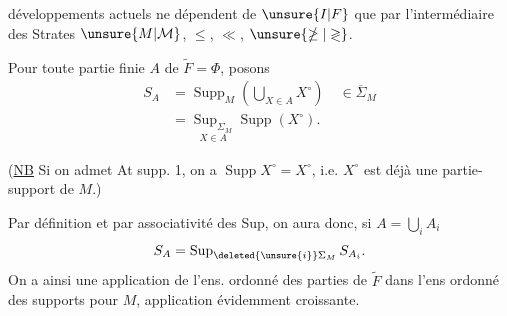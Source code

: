 développements actuels ne dépendent de $\unsure{I|F}$ que par l'intermédiaire des Strates $\unsure{M|\mathcal M}$, $\leq$, $\ll$, $\unsure{\ngeq|\gtrless}$.


Pour toute partie finie $A$ de $\widetilde F=\Phi$, posons
\[
\begin{aligned}
S_A&=\operatorname{Supp}_{M}\left(\bigcup_{X\in A}X^\circ\right)\quad\in\overline\Sigma_M\\
&=\underset{X\in A}{\operatorname{Sup}_{\Sigma_M}}\operatorname{Supp}(X^\circ).
\end{aligned}
\]
\margin{$\deleted{\unsure{\Rightarrow}}$}

(\uline{NB} Si on admet At supp. 1, on a $\operatorname{Supp}X^\circ=X^\circ$, i.e. $X^\circ$ est déjà une partie-support de $M$.)

Par définition et par associativité des Sup, on aura donc, si $A=\bigcup_i A_i$
\[
S_A=\operatorname{Sup}_{\deleted{\unsure{i}}\Sigma_M}S_{A_i}.
\]
On a ainsi une application
\diagram{\begin{tikzcd}[ampersand replacement=\&,column sep=large]
\unsure{\mathscr P|\mathcal P}(\widetilde F\unsure{]|)}\arrow[r]\&\Sigma_M\ ;\&A\arrow[r,mapsto]\&S_A
\end{tikzcd}}
de l'ens. ordonné des parties de $\widetilde F$ dans l'ens  ordonné des supports pour $M$, application évidemment croissante.
